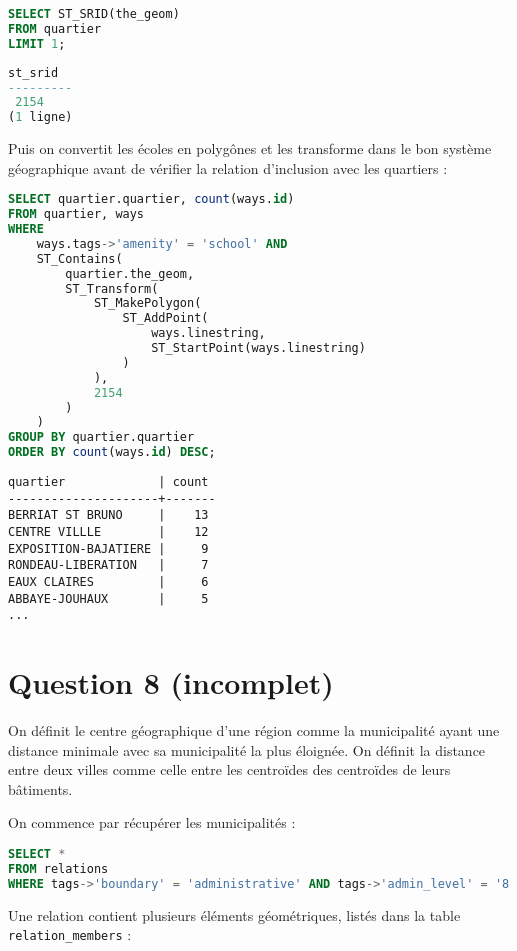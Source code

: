 \documentclass[12pt]{article}
\begin{document}
\begin{lstlisting}[language=SQL]
SELECT ST_SRID(the_geom)
FROM quartier
LIMIT 1;
\end{lstlisting}

\begin{lstlisting}[language=SQL]
st_srid
---------
 2154
(1 ligne)
\end{lstlisting}

Puis on convertit les écoles en polygônes et les transforme dans le bon
système géographique avant de vérifier la relation d'inclusion avec les quartiers :

\begin{lstlisting}[language=SQL]
SELECT quartier.quartier, count(ways.id)
FROM quartier, ways
WHERE
    ways.tags->'amenity' = 'school' AND
    ST_Contains(
        quartier.the_geom,
        ST_Transform(
            ST_MakePolygon(
                ST_AddPoint(
                    ways.linestring,
                    ST_StartPoint(ways.linestring)
                )
            ),
            2154
        )
    )
GROUP BY quartier.quartier
ORDER BY count(ways.id) DESC;
\end{lstlisting}

\begin{lstlisting}
quartier             | count 
---------------------+-------
BERRIAT ST BRUNO     |    13
CENTRE VILLLE        |    12
EXPOSITION-BAJATIERE |     9
RONDEAU-LIBERATION   |     7
EAUX CLAIRES         |     6
ABBAYE-JOUHAUX       |     5
...
\end{lstlisting}

\newpage

\section*{Question 8 (incomplet)}

On définit le centre géographique d'une région comme la municipalité ayant une
distance minimale avec sa municipalité la plus éloignée. On définit la distance
entre deux villes comme celle entre les centroïdes des centroïdes de leurs bâtiments.

On commence par récupérer les municipalités :

\begin{lstlisting}[language=SQL]
SELECT *
FROM relations
WHERE tags->'boundary' = 'administrative' AND tags->'admin_level' = '8';
\end{lstlisting}

Une relation contient plusieurs éléments géométriques, listés dans la table
\verb?relation_members? :
\end{document}
